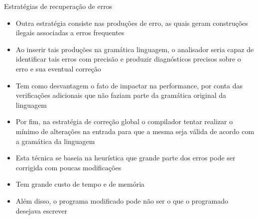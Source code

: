 \begin{frame}[fragile]{Estratégias de recuperação de erros}

    \begin{itemize}
        \item Outra estratégia consiste nas produções de erro, as quais geram construções ilegais associadas a erros frequentes
        \pause

        \item Ao inserir tais produções na gramática linguagem, o analisador seria capaz de identificar tais erros com precisão e produzir diagnósticos precisos
            sobre o erro e sua eventual correção
        \pause

        \item Tem como desvantagem o fato de impactar na performance, por conta das verificações adicionais que não faziam parte da gramática original da linguagem
        \pause

        \item Por fim, na estratégia de correção global o compilador tentar realizar o mínimo de alterações na entrada para que a mesma seja válida de acordo
            com a gramática da linguagem
        \pause

        \item Esta técnica se baseia na heurística que grande parte dos erros pode ser corrigida com poucas modificações
        \pause

        \item Tem grande custo de tempo e de memória
        \pause

        \item Além disso, o programa modificado pode não ser o que o programado desejava escrever
    \end{itemize}

\end{frame}
